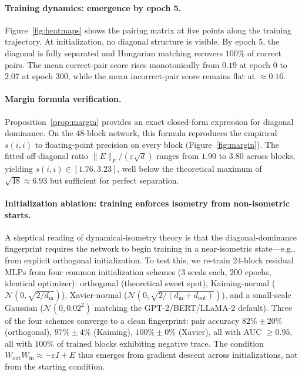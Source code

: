 \documentclass[wcp]{jmlr}
\begin{document}
\paragraph{Training dynamics: emergence by epoch 5.}
Figure~\ref{fig:heatmaps} shows the pairing matrix at five points along the training trajectory. At initialization, no diagonal structure is visible. By epoch 5, the diagonal is fully separated and Hungarian matching recovers $100\%$ of correct pairs. The mean correct-pair score rises monotonically from $0.19$ at epoch 0 to $2.07$ at epoch 300, while the mean incorrect-pair score remains flat at ${\approx}0.16$.

\paragraph{Margin formula verification.}
Proposition~\ref{prop:margin} provides an exact closed-form expression for diagonal dominance. On the 48-block network, this formula reproduces the empirical $s(i,i)$ to floating-point precision on every block (Figure~\ref{fig:margin}). The fitted off-diagonal ratio $\|E\|_F/(\varepsilon\sqrt{d})$ ranges from $1.90$ to $3.80$ across blocks, yielding $s(i,i) \in [1.76, 3.23]$, well below the theoretical maximum of $\sqrt{48} \approx 6.93$ but sufficient for perfect separation.

\paragraph{Initialization ablation: training enforces isometry from non-isometric starts.}
A skeptical reading of dynamical-isometry theory is that the diagonal-dominance fingerprint requires the network to begin training in a near-isometric state---e.g., from explicit orthogonal initialization. To test this, we re-train 24-block residual MLPs from four common initialization schemes (3 seeds each, 200 epochs, identical optimizer): orthogonal (theoretical sweet spot), Kaiming-normal ($\mathcal{N}(0, \sqrt{2/d_{\mathrm{in}}})$), Xavier-normal ($\mathcal{N}(0, \sqrt{2/(d_{\mathrm{in}}{+}d_{\mathrm{out}})})$), and a small-scale Gaussian ($\mathcal{N}(0, 0.02^2)$ matching the GPT-2/BERT/LLaMA-2 default). Three of the four schemes converge to a clean fingerprint: pair accuracy $82\%\pm 20\%$ (orthogonal), $97\%\pm 4\%$ (Kaiming), $100\%\pm 0\%$ (Xavier), all with AUC $\geq 0.95$, all with $100\%$ of trained blocks exhibiting negative trace. The condition $W_{\mathrm{out}}W_{\mathrm{in}}\approx -\varepsilon I + E$ thus emerges from gradient descent across initializations, not from the starting condition.
\end{document}
